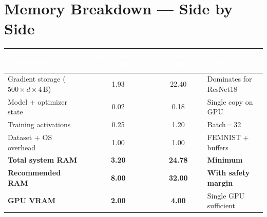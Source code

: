 \documentclass[11pt,a4paper]{article}
\newcommand{\mobnet}{MobileNetV3-S}
\newcommand{\resnet}{ResNet18}
\begin{document}
\section*{Memory Breakdown --- Side by Side}

\noindent
\begin{center}
\renewcommand{\arraystretch}{1.3}
\begin{tabular}{
  >{\raggedright\arraybackslash}p{5cm}
  S[table-format=2.2]
  S[table-format=2.2]
  >{\raggedright\arraybackslash}p{3.8cm}}
\toprule
{}
\textcolor{white}{\textbf{Component}} &
\textcolor{white}{\textbf{\mobnet{} (GB)}} &
\textcolor{white}{\textbf{\resnet{} (GB)}} &
\textcolor{white}{\textbf{Notes}} \\
\midrule
Gradient storage ($500 \times d \times 4$\,B)
                        & 1.93   & 22.40  & Dominates for ResNet18 \\
Model + optimizer state & 0.02   & 0.18   & Single copy on GPU \\
Training activations    & 0.25   & 1.20   & Batch\,=\,32 \\
Dataset + OS overhead   & 1.00   & 1.00   & FEMNIST + buffers \\
\midrule
\textbf{Total system RAM}  & \textbf{3.20}  & \textbf{24.78} & \textbf{Minimum} \\
\textbf{Recommended RAM}   & \textbf{8.00}  & \textbf{32.00} & \textbf{With safety margin} \\
\midrule
\textbf{GPU VRAM}           & \textbf{2.00}  & \textbf{4.00}  & Single GPU sufficient \\
\bottomrule
\end{tabular}
\end{center}
\end{document}
